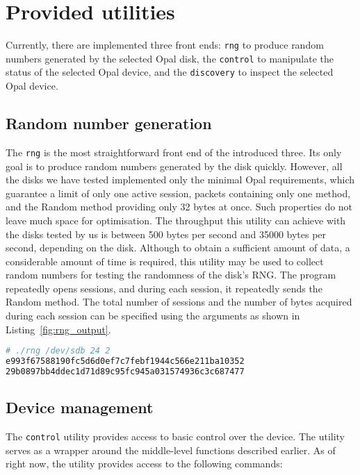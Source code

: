 \section{Provided utilities}

Currently, there are implemented three front ends: \verb|rng| to produce random numbers generated by the selected Opal disk, the \verb|control| to manipulate the status of the selected Opal device, and the \verb|discovery| to inspect the selected Opal device.

\subsection{Random number generation}


The \verb|rng| is the most straightforward front end of the introduced three. Its only goal is to produce random numbers generated by the disk quickly. However, all the disks we have tested implemented only the minimal Opal requirements, which guarantee a limit of only one active session, packets containing only one method, and the Random method providing only 32 bytes at once. Such properties do not leave much space for optimisation. The throughput this utility can achieve with the disks tested by us is between 500 bytes per second and 35000 bytes per second, depending on the disk. Although to obtain a sufficient amount of data, a considerable amount of time is required, this utility may be used to collect random numbers for testing the randomness of the disk's RNG.
The program repeatedly opens sessions, and during each session, it repeatedly sends the Random method. The total number of sessions and the number of bytes acquired during each session can be specified using the arguments as shown in Listing~\ref{fig:rng_output}.

\begin{lstlisting}[language=Bash,caption={Usage and output of the \texttt{rng} utility},label={fig:rng_output}]
# ./rng /dev/sdb 24 2
e993f67588190fc5d6d0ef7c7febf1944c566e211ba10352
29b0897bb4ddec1d71d89c95fc945a031574936c3c687477
\end{lstlisting}

\subsection{Device management}

The \verb|control| utility provides access to basic control over the device.
The utility serves as a wrapper around the middle-level functions described earlier.
As of right now, the utility provides access to the following commands:

